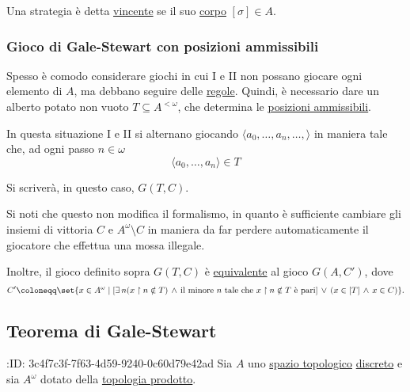 \documentclass{article}
\newcommand{\1}{\mathds{1}}
\begin{document}
Una strategia è detta \uline{vincente} se il suo \href{../../../../../../../org/roam/20250514142251-corpo_di_un_albero.org}{corpo} \([\sigma] \in A\).
\subsubsection{Gioco di Gale-Stewart con posizioni ammissibili}
\label{sec:org32c74c6}
Spesso è comodo considerare giochi in cui I e II non possano giocare ogni elemento di \(A\), ma debbano seguire delle \uline{regole}. Quindi, è necessario dare un alberto potato non vuoto \(T \subseteq A^{<\omega}\), che determina le \href{../../../../../../../org/roam/20250514142938-posizioni_ammissibili_in_un_gioco_logico.org}{\uline{posizioni ammissibili}}.

In questa situazione I e II si alternano giocando \(\langle a_{0},\dots,a_{n},\dots,\rangle\) in maniera tale che, ad ogni passo \(n \in \omega\)
\begin{equation*}
\langle a_{0},\dots,a_{n}\rangle \in T
\end{equation*}

Si scriverà, in questo caso, \(G(T, C)\).

Si noti che questo non modifica il formalismo, in quanto è sufficiente cambiare gli insiemi di vittoria \(C\) e \(A^{\omega}\setminus C\) in maniera da far perdere automaticamente il giocatore che effettua una mossa illegale.

Inoltre, il gioco definito sopra \(G(T,C)\) è \href{../../../../../../../org/roam/20250514143441-giochi_logici_equivalenti.org}{equivalente} al gioco \(G(A, C')\), dove
\begin{equation*}
C' \coloneqq \set{x \in A^{\omega}\mid \left[\exists\, n (x\upharpoonright n \notin T) \,\land\, \text{il minore }n\text{ tale che }x\upharpoonright n \notin T\text{ è pari}\right] \,\lor\, (x \in [T] \,\land\, x \in C)}.
\end{equation*}
\subsection{Teorema di Gale-Stewart}
\label{sec:orgf56b48c}

:ID:       3c4f7c3f-7f63-4d59-9240-0c60d79e42ad
Sia \(A\) uno \href{../../../../../../../org/roam/20250103145124-topologia.org}{spazio topologico} \href{../../../../../../../org/roam/20250317165247-topologia_discreta.org}{discreto} e sia \(A^{\omega}\) dotato della \href{../../../../../../../org/roam/20250109154723-topologia_prodotto.org}{topologia prodotto}.
\end{document}
